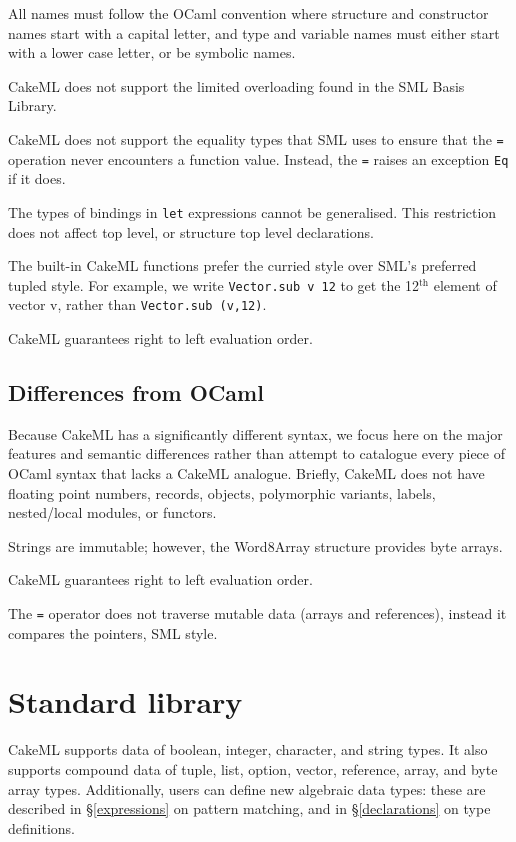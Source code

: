 \documentclass[12pt,a4paper]{book}
\begin{document}
All names must follow the OCaml convention where structure and constructor names start with a capital letter, and type and variable names must either start with a lower case letter, or be symbolic names.

CakeML does not support the limited overloading found in the SML Basis Library.

CakeML does not support the equality types that SML uses to ensure that the \texttt{=} operation never encounters a function value. Instead, the \texttt{=} raises an exception \texttt{Eq} if it does.

The types of bindings in \texttt{let} expressions cannot be generalised. This restriction does not affect top level, or structure top level declarations.

The built-in CakeML functions prefer the curried style over SML's preferred tupled style. For example, we write \texttt{Vector.sub v 12} to get the 12$^\textrm{th}$ element of vector v, rather than \texttt{Vector.sub (v,12)}.

CakeML guarantees right to left evaluation order.

\section{Differences from OCaml}

Because CakeML has a significantly different syntax, we focus here on the major features and semantic differences rather than attempt to catalogue every piece of OCaml syntax that lacks a CakeML analogue. Briefly, CakeML does not have floating point numbers, records, objects, polymorphic variants, labels, nested/local modules, or functors.

Strings are immutable; however, the Word8Array structure provides byte arrays.

CakeML guarantees right to left evaluation order.

The \texttt{=} operator does not traverse mutable data (arrays and references), instead it compares the pointers, SML style.

\chapter{Standard library}
\label{ch:stdlib}

CakeML supports data of boolean, integer, character, and string types. It also supports compound data of tuple, list, option, vector, reference, array, and byte array types. Additionally, users can define new algebraic data types: these are described in  \S\ref{expressions} on pattern matching, and in \S\ref{declarations} on type definitions.
\end{document}
